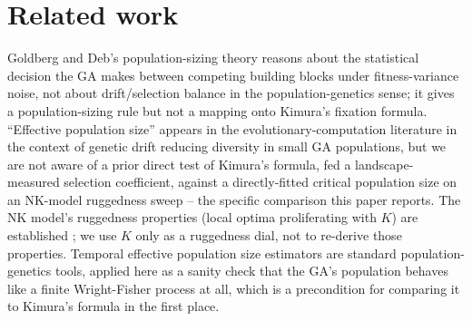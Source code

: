 \section{Related work}

Goldberg and Deb's population-sizing theory \cite{goldberg1991sizing}
reasons about the statistical decision the GA makes between competing
building blocks under fitness-variance noise, not about drift/selection
balance in the population-genetics sense; it gives a population-sizing
rule but not a mapping onto Kimura's fixation formula. ``Effective
population size'' appears in the evolutionary-computation literature in
the context of genetic drift reducing diversity in small GA populations,
but we are not aware of a prior direct test of Kimura's formula, fed a
landscape-measured selection coefficient, against a directly-fitted
critical population size on an NK-model ruggedness sweep -- the specific
comparison this paper reports. The NK model's ruggedness properties (local
optima proliferating with $K$) are established
\cite{kauffman1987towards,weinberger1991local}; we use $K$ only as a
ruggedness dial, not to re-derive those properties. Temporal effective
population size estimators \cite{krimbas1971drift,waples1989temporal}
are standard population-genetics tools, applied here as a sanity check
that the GA's population behaves like a finite Wright-Fisher process at
all, which is a precondition for comparing it to Kimura's formula in the
first place.
